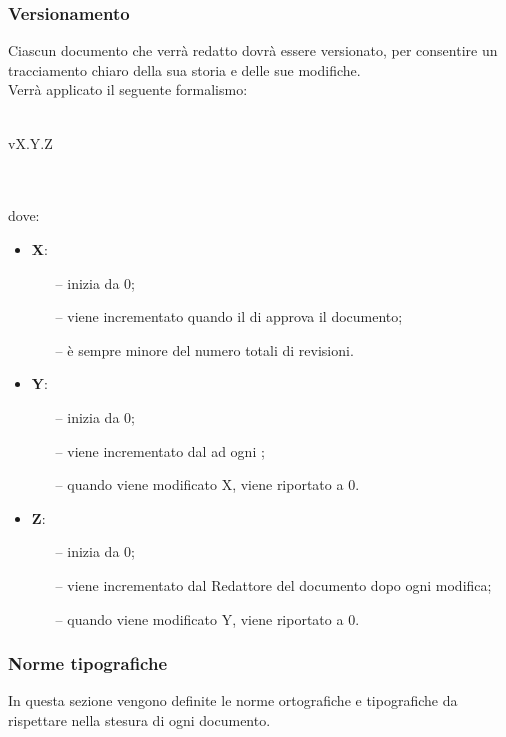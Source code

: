 \subsubsection{Versionamento}
Ciascun documento che verrà redatto dovrà essere versionato, per consentire un tracciamento chiaro della sua storia e delle sue modifiche.\\Verrà applicato il seguente formalismo:\\ \\ \centerline{vX.Y.Z}\\ \\dove:
\begin{itemize}
	\item \textbf{X}:
	\begin{itemize}
		\item[--]inizia da 0;
		\item[--]viene incrementato quando il \RESP{} di  approva il documento;
		\item[--]è sempre minore del numero totali di revisioni.
	\end{itemize}
	\item \textbf{Y}:
	\begin{itemize}
		\item[--]inizia da 0;
		\item[--]viene incrementato dal \VER{} ad ogni ;
		\item[--]quando viene modificato X, viene riportato a 0.
	\end{itemize}
	\item \textbf{Z}:
	\begin{itemize}
		\item[--]inizia da 0;
		\item[--]viene incrementato dal Redattore del documento dopo ogni modifica;
		\item[--]quando viene modificato Y, viene riportato a 0.
	\end{itemize}
\end{itemize}
\subsubsection{Norme tipografiche}
In questa sezione vengono definite le norme ortografiche e tipografiche da rispettare nella stesura di ogni documento.

